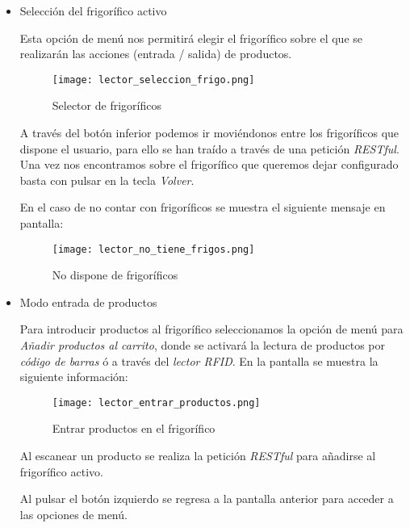 \begin{itemize}

    \item Selección del frigorífico activo

        Esta opción de menú nos permitirá elegir el frigorífico sobre el que se realizarán las acciones (entrada / salida) de productos.

        \begin{figure}[h!]
            \centering
            \texttt{[image: lector\_seleccion\_frigo.png]}
            \caption{Selector de frigoríficos}\label{fig:lector_seleccion_frigo}
        \end{figure}


        A través del botón inferior podemos ir moviéndonos entre los frigoríficos que dispone el usuario, para ello se han traído a través de una petición \emph{RESTful}. Una vez nos encontramos sobre el frigorífico que queremos dejar configurado basta con pulsar en la tecla \emph{Volver}.

        En el caso de no contar con frigoríficos se muestra el siguiente mensaje en pantalla:

        \begin{figure}[h!]
            \centering
            \texttt{[image: lector\_no\_tiene\_frigos.png]}
            \caption{No dispone de frigoríficos}\label{fig:lector_no_tiene_frigos}
        \end{figure}

    \item Modo entrada de productos

        Para introducir productos al frigorífico seleccionamos la opción de menú para \emph{Añadir productos al carrito}, donde se activará la lectura de productos por \emph{código de barras} ó a través del \emph{lector RFID}. En la pantalla se muestra la siguiente información:

        \begin{figure}[h!]
            \centering
            \texttt{[image: lector\_entrar\_productos.png]}
            \caption{Entrar productos en el frigorífico}\label{fig:lector_entrar_productos}
        \end{figure}

        Al escanear un producto se realiza la petición \emph{RESTful} para añadirse al frigorífico activo.

        Al pulsar el botón izquierdo se regresa a la pantalla anterior para acceder a las opciones de menú.


\end{itemize}
